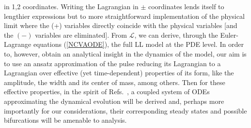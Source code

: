 in 1,2 coordinates. Writing the Lagrangian in $\pm$ coordinates lends
itself to lengthier expressions but to more straightforward implementation
of the physical limit where the (+) variables directly coincide with the
physical variables [and the $(-)$ variables are eliminated].
%
From $\mathcal{L} $, we can derive, through the Euler-Lagrange
equations (\ref{NCVAODE}), the full LL model at the PDE level.
In order to, however, obtain an analytical insight in the dynamics
of the model, our aim is to use an ansatz approximation of the
pulse reducing its Lagrangian to a Lagrangian over effective
(yet time-dependent) properties of its form, like the amplitude,
the width and its center of mass, among others. Then for these
effective properties, in the spirit of Refs.~\cite{JuliaNCVA,ref4},
a coupled system of 
ODEs approximating
the dynamical evolution will be derived and, perhaps more
importantly for our considerations, their corresponding steady
states and possible bifurcations will be amenable to 
analysis. 

